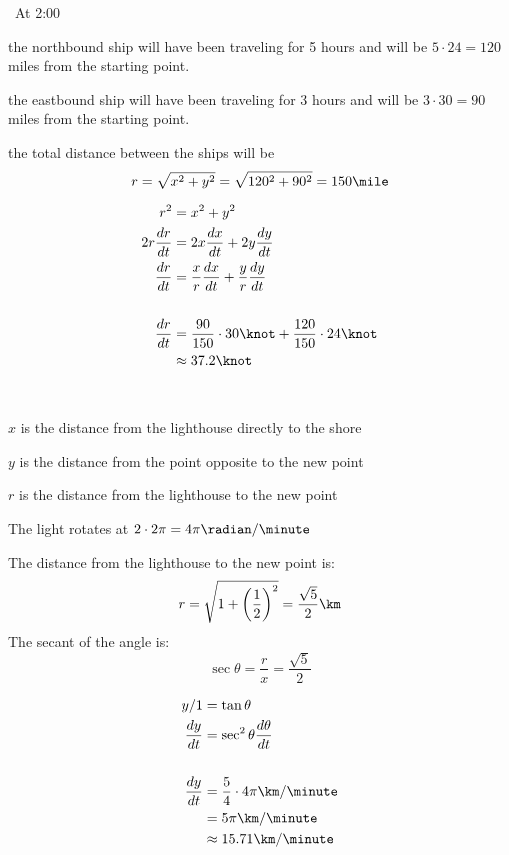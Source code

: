 \documentclass[fleqn]{exam}
\begin{document}
\begin{description}
\pagebreak

\item[14]
\
At 2:00
\begin{itemize*}
\item the northbound ship will have been traveling for 5 hours and will be $5 \cdot 24 = 120$ miles from the starting point.
\item the eastbound ship will have been traveling for 3 hours and will be $3 \cdot 30 = 90$ miles from the starting point.
\item the total distance between the ships will be 
\[
  r = \sqrt{x^2 + y^2} = \sqrt{120^2 + 90^2} = 150 \mile
\]
\end{itemize*}

\begin{align*}
  r^2 &= x^2 + y^2 \\
  2 r \frac{dr}{dt} &= 2x \frac{dx}{dt} + 2y \frac{dy}{dt} \\
  \frac{dr}{dt} &= \frac{x}{r} \frac{dx}{dt} + \frac{y}{r} \frac{dy}{dt} \\
  \\
  \frac{dr}{dt} &= \frac{90}{150} \cdot 30 \knot + \frac{120}{150} \cdot 24 \knot \\
  &\approx 37.2 \knot \\
\end{align*}

\item[15]
\
\begin{itemize*}
\item $x$ is the distance from the lighthouse directly to the shore
\item $y$ is the distance from the point opposite to the new point
\item $r$ is the distance from the lighthouse to the new point
\item The light rotates at $2 \cdot 2 \pi = 4 \pi \radian / \minute$ 
\end{itemize*}

The distance from the lighthouse to the new point is:
\[
  r = \sqrt{1 + \left(\frac{1}{2}\right)^2} = \frac{\sqrt{5}}{2} \km
\]
The secant of the angle is:
\[
  \sec \theta = \frac{r}{x} = \frac{\sqrt{5}}{2}
\]

\begin{align*}
  y / 1 &= \tan \theta \\
  \frac{dy}{dt} &= \sec^2 \theta \frac{d \theta}{dt} \\
  \\
  \frac{dy}{dt} &= \frac{5}{4} \cdot 4 \pi \km / \minute \\
  &= 5 \pi \km / \minute \\
  &\approx 15.71 \km / \minute \\
\end{align*}


\end{description}
\end{document}
